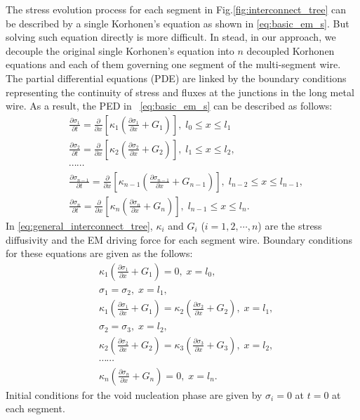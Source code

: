 The stress evolution process for each segment in
Fig.\ref{fig:interconnect_tree} can be described by a single
Korhonen's equation as shown in \eqref{eq:basic_em_s}. But solving
such equation directly is more difficult.  In stead, in our approach,
we decouple the original single Korhonen's equation into $n$
decoupled Korhonen equations and each of them governing one segment of
the multi-segment wire. The partial differential equations (PDE) are
linked by the boundary conditions representing the continuity of
stress and fluxes at the junctions in the long metal wire. As a
result, the PED in ~\eqref{eq:basic_em_s} can be described as follows:
\begin{equation} \label{eq:general_interconnect_tree}
\begin{split}
&\frac{\partial \sigma_1}{\partial t}=\frac{\partial }{\partial
x}[\kappa_1(\frac{\partial \sigma_1}{\partial x}+G_1)],\;l_0\leq x \leq l_1 \\
&\frac{\partial \sigma_2}{\partial t}=\frac{\partial }{\partial
x}[\kappa_2(\frac{\partial \sigma_2}{\partial
x}+G_2)],\;l_1\leq x \leq l_2, \\
&\cdots\cdots\\
&\frac{\partial \sigma_{n-1}}{\partial t}=\frac{\partial }{\partial
x}[\kappa_{n-1}(\frac{\partial \sigma_{n-1}}{\partial
x}+G_{n-1})],\;l_{n-2}\leq x \leq l_{n-1}, \\
&\frac{\partial \sigma_{n}}{\partial t}=\frac{\partial }{\partial
x}[\kappa_{n}(\frac{\partial \sigma_{n}}{\partial
x}+G_{n})],\;l_{n-1}\leq x \leq l_n.
 \end{split}
 \end{equation}
 In \eqref{eq:general_interconnect_tree}, $\kappa_{i}$ and $G_i$
 ($i=1,2,\cdots,n$) are the stress diffusivity and the EM driving
 force for each segment wire.  Boundary conditions for these equations
 are given as the follows:
 \begin{equation} \label{bc:general_interconnect_tree}
\begin{split}
&\kappa_1(\frac{\partial \sigma_1}{\partial x}+G_1)=0,\;x=l_0,\\
&\sigma_1=\sigma_2,\;x=l_1,\\
&\kappa_1(\frac{\partial \sigma_1}{\partial
x}+G_1)=\kappa_2(\frac{\partial \sigma_2}{\partial
x}+G_2),\;x=l_1,\\
&\sigma_2=\sigma_3,\;x=l_2,\\
&\kappa_2(\frac{\partial \sigma_2}{\partial
x}+G_2)=\kappa_3(\frac{\partial \sigma_3}{\partial
x}+G_3),\;x=l_2,\\
&\cdots\cdots \\
&\kappa_n(\frac{\partial \sigma_n}{\partial
x}+G_n)=0,\;x=l_n.
 \end{split}
 \end{equation}
 Initial conditions for the void nucleation phase are given by
 $\sigma_i=0$ at $t=0$ at each segment. 

